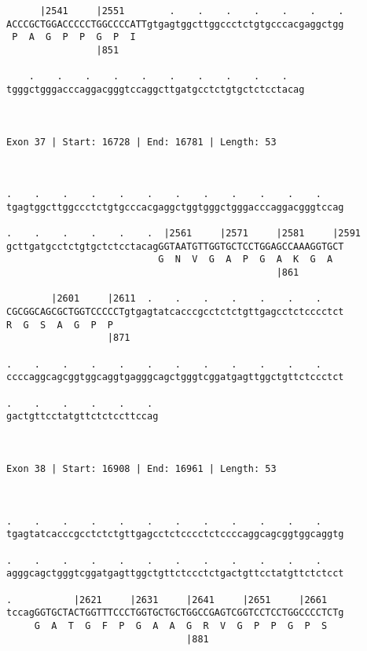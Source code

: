 \documentclass{article}
\begin{document}
\begin{Verbatim}
      |2541     |2551        .    .    .    .    .    .    .
ACCCGCTGGACCCCCTGGCCCCATTgtgagtggcttggccctctgtgcccacgaggctgg
 P  A  G  P  P  G  P  I                                     
                |851                                        
  
    .    .    .    .    .    .    .    .    .    .   
tgggctgggacccaggacgggtccaggcttgatgcctctgtgctctcctacag
                                                     
                                                     
 
Exon 37 | Start: 16728 | End: 16781 | Length: 53



.    .    .    .    .    .    .    .    .    .    .    .    
tgagtggcttggccctctgtgcccacgaggctggtgggctgggacccaggacgggtccag
                                                            
.    .    .    .    .    .  |2561     |2571     |2581     |2591
gcttgatgcctctgtgctctcctacagGGTAATGTTGGTGCTCCTGGAGCCAAAGGTGCT
                           G  N  V  G  A  P  G  A  K  G  A  
                                                |861        
  
        |2601     |2611  .    .    .    .    .    .    .    
CGCGGCAGCGCTGGTCCCCCTgtgagtatcacccgcctctctgttgagcctctcccctct
R  G  S  A  G  P  P                                         
                  |871                                      
  
.    .    .    .    .    .    .    .    .    .    .    .    
ccccaggcagcggtggcaggtgagggcagctgggtcggatgagttggctgttctccctct
                                                            
.    .    .    .    .    . 
gactgttcctatgttctctccttccag
                           
                           
 
Exon 38 | Start: 16908 | End: 16961 | Length: 53



.    .    .    .    .    .    .    .    .    .    .    .    
tgagtatcacccgcctctctgttgagcctctcccctctccccaggcagcggtggcaggtg
                                                            
.    .    .    .    .    .    .    .    .    .    .    .    
agggcagctgggtcggatgagttggctgttctccctctgactgttcctatgttctctcct
                                                            
.           |2621     |2631     |2641     |2651     |2661   
tccagGGTGCTACTGGTTTCCCTGGTGCTGCTGGCCGAGTCGGTCCTCCTGGCCCCTCTg
     G  A  T  G  F  P  G  A  A  G  R  V  G  P  P  G  P  S   
                                |881                        
  

\end{Verbatim}
\end{document}
